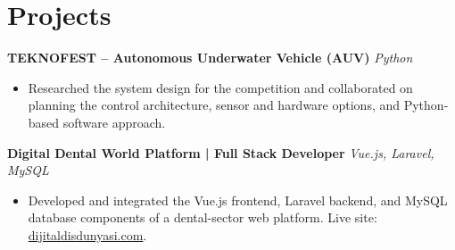 
\section{Projects}

\textbf{TEKNOFEST – Autonomous Underwater Vehicle (AUV)} \hfill \textit{Python}
\begin{itemize}
    \item Researched the system design for the competition and collaborated on planning the control architecture, sensor and hardware options, and Python-based software approach.
\end{itemize}

\vspace{4pt}

\noindent \textbf{Digital Dental World Platform | Full Stack Developer} \hfill \textit{Vue.js, Laravel, MySQL}
\begin{itemize}
    \item Developed and integrated the Vue.js frontend, Laravel backend, and MySQL database components of a dental-sector web platform. Live site: \href{https://dijitaldisdunyasi.com/}{dijitaldisdunyasi.com}.
\end{itemize}
